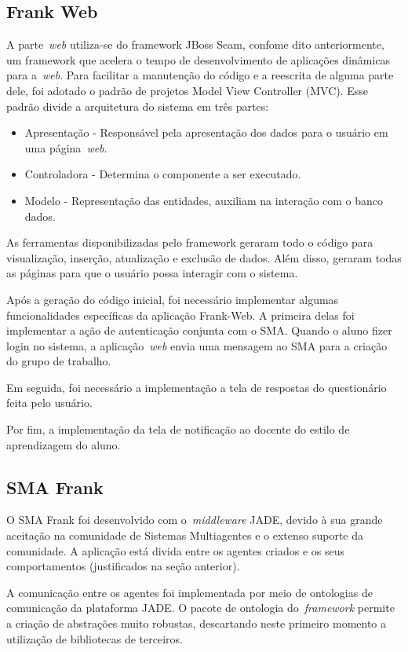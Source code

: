 \subsection{Frank Web}
A parte~\emph{web} utiliza-se do framework JBoss Seam, confome dito anteriormente, um framework que acelera o tempo de desenvolvimento de aplicações dinâmicas para a~\emph{web}. Para facilitar a manutenção do código e a reescrita de alguma parte dele, foi adotado o padrão de projetos
Model View Controller (MVC). Esse padrão divide a arquitetura do sistema em três partes:

\begin{itemize}
	\item Apresentação - Responsável pela apresentação dos dados para o usuário em uma página~\emph{web}.
	\item Controladora - Determina o componente a ser executado.
	\item Modelo - Representação das entidades, auxiliam na interação com o banco dados.
\end{itemize}

As ferramentas disponibilizadas pelo framework geraram todo o código para visualização, inserção, atualização e exclusão de dados. Além disso, geraram todas as páginas para que o usuário possa interagir com o sistema. 

Após a geração do código inicial, foi necessário implementar algumas funcionalidades específicas da aplicação Frank-Web. A primeira delas foi implementar a ação de autenticação conjunta com o SMA. Quando o aluno fizer login no sistema, a aplicação~\emph{web} envia uma mensagem ao SMA para a criação do grupo de trabalho.

Em seguida, foi necessário a implementação a tela de respostas do questionário feita pelo usuário.

Por fim, a implementação da tela de notificação ao docente do estilo de aprendizagem do aluno.

\subsection{SMA Frank}

O SMA Frank foi desenvolvido com o~\emph{middleware} JADE, devido à sua grande aceitação na comunidade de Sistemas Multiagentes e o extenso suporte da comunidade. A aplicação está divida entre os agentes criados e os seus comportamentos (justificados na seção anterior).

A comunicação entre os agentes foi implementada por meio de ontologias de comunicação da plataforma JADE. O pacote de ontologia do~\emph{framework} permite a criação de abstrações muito robustas, descartando neste primeiro momento a utilização de bibliotecas de terceiros.

